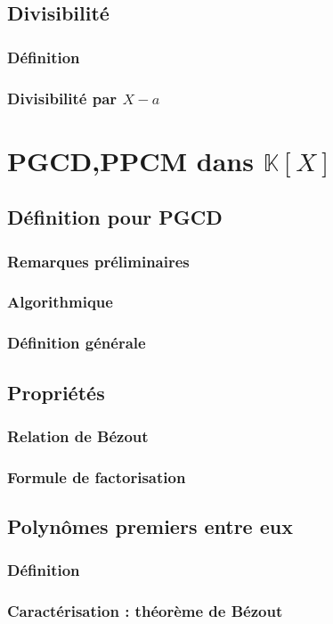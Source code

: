 \documentclass[12pt,a4paper,french]{book}
\begin{document}
		\subsection{Divisibilité}
			\subsubsection{Définition}
			\subsubsection{Divisibilité par $X-a$}
	\section{PGCD,PPCM dans $\mathbb{K}[X]$}
		\subsection{Définition pour PGCD}
			\subsubsection{Remarques préliminaires}
			\subsubsection{Algorithmique}
			\subsubsection{Définition générale}
		\subsection{Propriétés}
			\subsubsection{Relation de Bézout}
			\subsubsection{Formule de factorisation}
		\subsection{Polynômes premiers entre eux}
			\subsubsection{Définition}
			\subsubsection{Caractérisation : théorème de Bézout}
\end{document}

